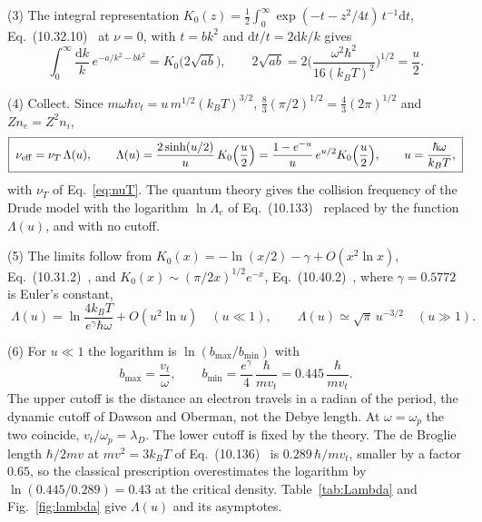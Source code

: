 \documentclass[11pt]{article}
\numberwithin{equation}{section}
\newcommand{\nuT}{\nu_T}
\newcommand{\nueff}{\nu_{\rm eff}}
\newcommand{\dd}{\mathrm d}
\newcommand{\kB}{k_B}
\begin{document}
{\noindent}(3) The integral representation
$K_0(z)=\frac12\int_0^\infty\exp(-t-z^2/4t)\,t^{-1}\dd t$,
Eq.~(10.32.10)~\cite{DLMF} at $\nu=0$, with $t=bk^2$ and $\dd t/t=2\dd k/k$
gives
\begin{equation}
\int_0^\infty\frac{\dd k}{k}\,e^{-a/k^2-bk^2}=K_0\big(2\sqrt{ab}\big),\qquad
2\sqrt{ab}=2\Big(\frac{\omega^2\hbar^2}{16(\kB T)^2}\Big)^{1/2}=\frac u2.
\label{eq:K0-integral}
\end{equation}

{\noindent}(4) Collect. Since $m\omega\hbar v_t=u\,m^{1/2}(\kB T)^{3/2}$,
$\tfrac83(\pi/2)^{1/2}=\tfrac43(2\pi)^{1/2}$ and $Zn_e=Z^2n_i$,
\begin{equation}
\boxed{\;\nueff=\nuT\,\Lambda(u),\qquad
\Lambda(u)=\frac{2\sinh(u/2)}{u}\,K_0\Big(\frac u2\Big)
=\frac{1-e^{-u}}{u}\,e^{u/2}K_0\Big(\frac u2\Big),\qquad u=\frac{\hbar\omega}{\kB T},\;}
\label{eq:Lambda-mb}
\end{equation}
with $\nuT$ of Eq.~\eqref{eq:nuT}. The quantum theory gives the collision
frequency of the Drude model with the logarithm $\ln\Lambda_e$ of
Eq.~(10.133)~\cite{Atzeni2004} replaced by the function $\Lambda(u)$, and with
no cutoff.

{\noindent}(5) The limits follow from $K_0(x)=-\ln(x/2)-\gamma+O(x^2\ln x)$,
Eq.~(10.31.2)~\cite{DLMF}, and $K_0(x)\sim(\pi/2x)^{1/2}e^{-x}$,
Eq.~(10.40.2)~\cite{DLMF}, where $\gamma=0.5772$ is Euler's constant,
\begin{equation}
\boxed{\;\Lambda(u)=\ln\frac{4\kB T}{e^\gamma\hbar\omega}+O(u^2\ln u)\quad(u\ll1),\qquad
\Lambda(u)\simeq\sqrt\pi\,u^{-3/2}\quad(u\gg1).\;}
\label{eq:Lambda-limits}
\end{equation}

{\noindent}(6) For $u\ll1$ the logarithm is $\ln(b_{\max}/b_{\min})$ with
\begin{equation}
b_{\max}=\frac{v_t}{\omega},\qquad b_{\min}=\frac{e^\gamma}{4}\,\frac{\hbar}{mv_t}=0.445\,\frac{\hbar}{mv_t}.
\label{eq:cutoffs}
\end{equation}
The upper cutoff is the distance an electron travels in a radian of the
period, the dynamic cutoff of Dawson and Oberman, not the Debye length. At
$\omega=\omega_p$ the two coincide, $v_t/\omega_p=\lambda_D$. The lower cutoff is
fixed by the theory. The de Broglie length $\hbar/2mv$ at $mv^2=3\kB T$ of
Eq.~(10.136)~\cite{Atzeni2004} is $0.289\,\hbar/mv_t$, smaller by a factor
$0.65$, so the classical prescription overestimates the logarithm by
$\ln(0.445/0.289)=0.43$ at the critical density. Table~\ref{tab:Lambda} and
Fig.~\ref{fig:lambda} give $\Lambda(u)$ and its asymptotes.
\end{document}

